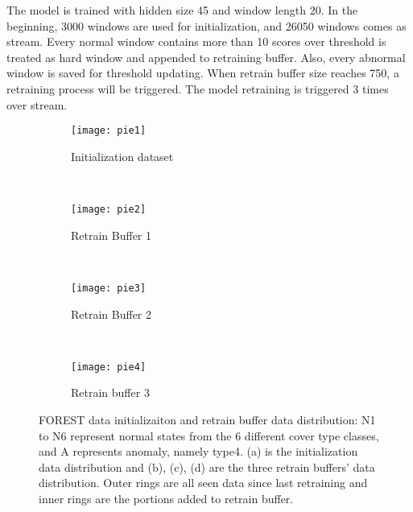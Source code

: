 The model is trained with hidden size 45 and window length 20. In the beginning, 3000 windows are used for initialization, and 26050 windows comes as stream.  Every normal window contains more than 10 scores over threshold is treated as hard window and appended to retraining buffer. Also, every abnormal window is saved for threshold updating.  When retrain buffer size reaches 750, a retraining process will be triggered. The model retraining is triggered 3 times over stream. 

\begin{figure}[ht]
\centering
	\begin {subfigure}[t]{0.45\textwidth}
	\centering
	\texttt{[image: pie1]}
	\caption{Initialization dataset}
	\label{fig:init}
	\end{subfigure}
	~
	\begin {subfigure}[t]{0.45\textwidth}
	\centering
	\texttt{[image: pie2]}
	\caption{Retrain Buffer 1}
	\label{fig:buf1}
	\end{subfigure}
	~
	\begin {subfigure}[t]{0.45\textwidth}
	\centering
	\texttt{[image: pie3]}
	\caption{Retrain Buffer 2}
	\label{fig:buf2}
	\end{subfigure}
	~
	\begin {subfigure}[t]{0.45\textwidth}
	\centering
	\texttt{[image: pie4]}
	\caption{Retrain buffer 3}
	\label{fig:buf3}
	\end{subfigure}

	\caption[FOREST data initializaiton and retrain buffer data distribution]{FOREST data initializaiton and retrain buffer data distribution: N1 to N6 represent normal states from the 6 different cover type classes, and A represents anomaly, namely type4. (a) is the initialization data distribution and (b), (c), (d) are the three retrain buffers' data distribution. Outer rings are all seen data since last retraining and inner rings are the portions added to retrain buffer.}
\label{fig:bufs}
\end{figure}








